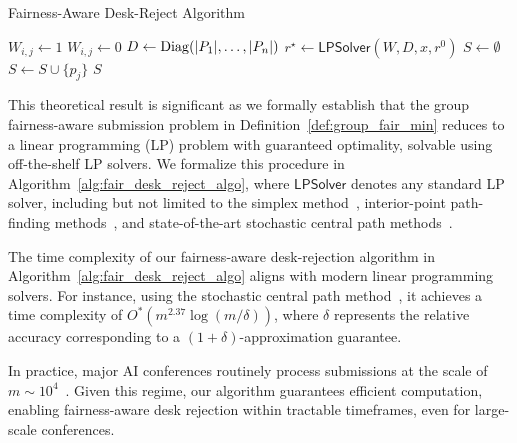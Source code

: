 \begin{algorithm}[!ht]
\caption{Fairness-Aware Desk-Reject Algorithm}
\label{alg:fair_desk_reject_algo}
\begin{algorithmic}[1]


\State $W_{i,j}\gets 1$
\Else
\State $W_{i,j}\gets 0$
\EndIf
\EndFor
\State $D\gets\operatorname{Diag}(|P_1|, \ldots, |P_n|)$
\State $r^{\star} \gets \mathsf{LPSolver}(W, D, x, r^0)$
\State $S\gets\emptyset$
\State $S\gets S \cup \{p_j\}$
\EndIf
\EndFor
\State \Return $S$ 
\EndProcedure
\end{algorithmic}
\end{algorithm}

This theoretical result is significant as we formally establish that the group fairness-aware submission problem in Definition~\ref{def:group_fair_min} reduces to a linear programming (LP) problem with guaranteed optimality, solvable using off-the-shelf LP solvers. We formalize this procedure in Algorithm~\ref{alg:fair_desk_reject_algo}, where $\mathsf{LPSolver}$ denotes any standard LP solver, including but not limited to the simplex method~\cite{bg69}, interior-point path-finding methods~\cite{ls14}, and state-of-the-art stochastic central path methods~\cite{cls19, jswz21}.

\begin{remark}
    The time complexity of our fairness-aware desk-rejection algorithm in Algorithm~\ref{alg:fair_desk_reject_algo} aligns with modern linear programming solvers. For instance, using the stochastic central path method~\cite{cls21,jswz21,vlss20,sy21}, it achieves a time complexity of $O^*(m^{2.37} \log(m/\delta))$, where $\delta$ represents the relative accuracy corresponding to a \((1+\delta)\)-approximation guarantee.
\end{remark}

\begin{remark}
    In practice, major AI conferences routinely process submissions at the scale of $m \sim 10^4$~\cite{stanford_ai_index}. Given this regime, our algorithm guarantees efficient computation, enabling fairness-aware desk rejection within tractable timeframes, even for large-scale conferences.
\end{remark}
